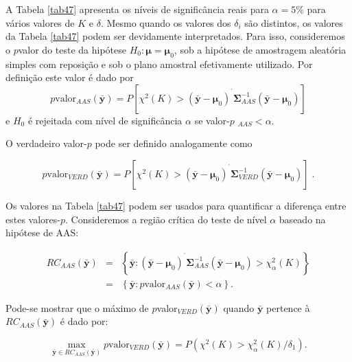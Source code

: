\documentclass[]{book}
\numberwithin{example}{chapter}
\numberwithin{remark}{chapter}
\numberwithin{definition}{chapter}
\begin{document}
A Tabela \ref{tab47} apresenta os níveis de significância reais para
\(\alpha =5\%\) para vários valores de \(K\) e \(\delta\). Mesmo quando
os valores dos \(\delta _{i}\) são distintos, os valores da Tabela
\ref{tab47} podem ser devidamente interpretados. Para isso, consideremos
o \(p\)valor do teste da hipótese
\(H_{0}:\mathbf{\mu }=\mathbf{\mu }_{0}\), sob a hipótese de amostragem
aleatória simples com reposição e sob o plano amostral efetivamente
utilizado. Por definição este valor é dado por \[
p\mbox{valor}_{AAS}\left( \mathbf{\bar{y}}\right) =P\left[ \chi ^{2}\left(
K\right) >\left( \mathbf{\bar{y}-\mu }_{0}\right) ^{^{\prime }}\mathbf{
\Sigma }_{AAS}^{-1}\left( \mathbf{\bar{y}-\mu }_{0}\right) \right] 
\] e \(H_{0}\) é rejeitada com nível de significância \(\alpha\) se
valor-\(p\) \(_{AAS}<\alpha\).

O verdadeiro valor-\(p\) pode ser definido analogamente como

\begin{equation}
p\mbox{valor}_{VERD}\left( \mathbf{\bar{y}}\right) =P\left[ \chi ^{2}\left(K\right) >\left( \mathbf{\bar{y}-\mu }_{0}\right) ^{^{\prime }}\mathbf{\Sigma }_{VERD}^{-1}\left( \mathbf{\bar{y}-\mu }_{0}\right) \right] \;.
\label{eq:epa13}
\end{equation}

Os valores na Tabela \ref{tab47} podem ser usados para quantificar a
diferença entre estes valores-\(p\). Consideremos a região crítica do
teste de nível \(\alpha\) baseado na hipótese de AAS:

\begin{eqnarray}
RC_{AAS}\left( \mathbf{\bar{y}}\right) &=&\left\{ \mathbf{\bar{y}:}\left( 
\mathbf{\bar{y}-\mu }_{0}\right) ^{^{\prime }}\mathbf{\Sigma }
_{AAS}^{-1}\left( \mathbf{\bar{y}-\mu }_{0}\right) >\chi _{\alpha
}^{2}\left( K\right) \right\} \label{eq:epa14}  \\
&=&\left\{ \mathbf{\bar{y}:}p\mbox{valor}_{AAS}\left( \mathbf{\bar{y}}
\right) <\alpha \right\}.  \nonumber
\end{eqnarray}

Pode-se mostrar que o máximo de
\(p\)valor\(_{VERD}\left( \mathbf{\bar{y}}\right)\) quando
\(\mathbf{\bar{y}}\) pertence à
\(RC_{AAS}\left( \mathbf{\bar{y}}\right)\) é dado por:

\begin{equation}
\max_{\mathbf{\bar{y}\in }RC_{AAS}\left( \mathbf{\bar{y}}\right) }p
\mbox{valor}_{VERD}\left( \mathbf{\bar{y}}\right) =P\left( \chi ^{2}\left(K\right) >\chi _{\alpha }^{2}\left( K\right) /\delta _{1}\right).
\label{eq:epa15}
\end{equation}
\end{document}
